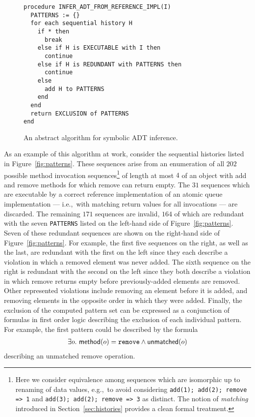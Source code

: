 \begin{figure}[t]
  \begin{verbatim}
procedure INFER_ADT_FROM_REFERENCE_IMPL(I)
  PATTERNS := {}
  for each sequential history H
    if * then
      break
    else if H is EXECUTABLE with I then
      continue
    else if H is REDUNDANT with PATTERNS then
      continue
    else
      add H to PATTERNS
    end
  end
  return EXCLUSION of PATTERNS
end
  \end{verbatim}
  \caption{An abstract algorithm for symbolic ADT inference.}
  \label{fig:abstract}
\end{figure}

As an example of this algorithm at work, consider the sequential histories
listed in Figure~\ref{fig:patterns}. These sequences arise from an enumeration
of all $202$ possible method invocation sequences\footnote{Here we consider
equivalence among sequences which are isomorphic up to renaming of data values,
e.g.,~to avoid considering {\tt add(1); add(2); remove => 1} and {\tt add(3);
add(2); remove => 3} as distinct. The notion of \emph{matching} introduced in
Section~\ref{sec:histories} provides a clean formal treatment.} of length at
most $4$ of an object with add and remove methods for which remove can return
empty. The $31$ sequences which are executable by a correct reference
implementation of an atomic queue implementation --- i.e.,~with matching return
values for all invocations --- are discarded. The remaining $171$ sequences are
invalid, $164$ of which are redundant with the seven {\tt PATTERNS} listed on
the left-hand side of Figure~\ref{fig:patterns}. Seven of these redundant
sequences are shown on the right-hand side of Figure~\ref{fig:patterns}. For
example, the first five sequences on the right, as well as the last, are
redundant with the first on the left since they each describe a violation in
which a removed element was never added. The sixth sequence on the right is
redundant with the second on the left since they both describe a violation in
which remove returns empty before previously-added elements are removed. Other
represented violations include removing an element before it is added, and
removing elements in the opposite order in which they were added. Finally, the
exclusion of the computed pattern set can be expressed as a conjunction of
formulas in first order logic describing the exclusion of each individual
pattern. For example, the first pattern could be described by the formula
\begin{align*}
  \exists o.\
    {\sf method}(o) = {\tt remove} \land {\sf unmatched}(o)
\end{align*}
describing an unmatched remove operation.


